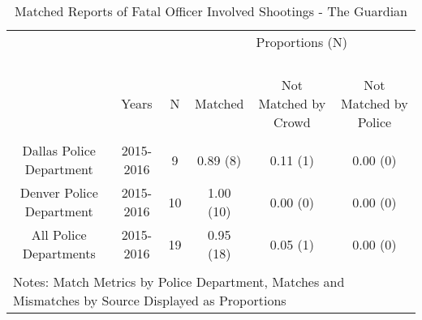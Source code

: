
\begin{table}[!htbp] \centering 
  \caption{Matched Reports of Fatal Officer Involved Shootings - The Guardian} 
  \label{} 
\footnotesize 
\begin{tabular}{@{\extracolsep{5pt}} cccccc} 
\\[-1.8ex]\hline 
 &&& \multicolumn{3}{c}{Proportions (N)} \\ \cline{4-6} \\[-4.8ex]  \\
\hline \\[-1.8ex] 
\hline \\[-1.8ex] 
 & Years & N & Matched & Not Matched by Crowd & Not Matched by Police \\ 
\hline \\[-1.8ex] 
Dallas Police Department & 2015-2016 & 9 & 0.89 (8) & 0.11 (1) & 0.00 (0) \\ 
Denver Police Department & 2015-2016 & 10 & 1.00 (10) & 0.00 (0) & 0.00 (0) \\ 
All Police Departments   & 2015-2016 & 19 & 0.95 (18) & 0.05 (1) & 0.00 (0) \\ 
\hline \\[-1.8ex] 
\multicolumn{6}{l}{Notes: Match Metrics by Police Department, Matches and Mismatches by Source Displayed as Proportions} \\ 
\end{tabular} 
\end{table}  
